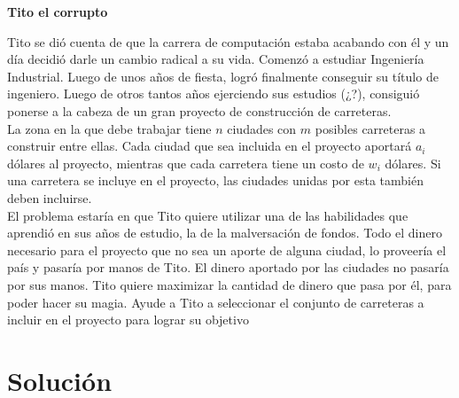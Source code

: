\documentclass[runningheads,a4paper]{llncs}
\begin{document}
	{
\begin{center}
{\large\bf Tito el corrupto}\\
\end{center}
Tito se di\'o cuenta de que la carrera de computaci\'on estaba acabando con \'el y
un d\'ia decidi\'o darle un cambio radical a su vida. Comenz\'o a estudiar Ingenier\'ia
Industrial. Luego de unos a\~nos de fiesta, logr\'o finalmente conseguir su t\'itulo
de ingeniero. Luego de otros tantos a\~nos ejerciendo sus estudios (¿?), consigui\'o
ponerse a la cabeza de un gran proyecto de construcci\'on de carreteras.\\

La zona en la que debe trabajar tiene $n$ ciudades con $m$ posibles carreteras
a construir entre ellas. Cada ciudad que sea incluida en el proyecto aportar\'a $a_i$
d\'olares al proyecto, mientras que cada carretera tiene un costo de $w_i$ d\'olares.
Si una carretera se incluye en el proyecto, las ciudades unidas por esta tambi\'en
deben incluirse.\\

El problema estar\'ia en que Tito quiere utilizar una de las habilidades que
aprendi\'o en sus a\~nos de estudio, la de la malversaci\'on de fondos. Todo el dinero
necesario para el proyecto que no sea un aporte de alguna ciudad, lo proveer\'ia
el pa\'is y pasar\'ia por manos de Tito. El dinero aportado por las ciudades no
pasar\'ia por sus manos. Tito quiere maximizar la cantidad de dinero que pasa
por \'el, para poder hacer su magia. Ayude a Tito a seleccionar el conjunto de
carreteras a incluir en el proyecto para lograr su objetivo

\newpage
\begin{abstract}
 Se tienen $n$ ciudades y $m$ posibles carreteras a construir, cada ciudad que sea incluida en el proyecto aportar\'a $a_i$ d\'olares y la construcci\'on de la carretera cuesta $w_i$ d\'olares. Todo el dinero necesario para el proyecto que no sea un aporte de alguna ciudad, lo proveer\'ia el pa\'is y entonces pasar\'ia a manos de Tito. Se quiere seleccionar un conjunto de carreteras a incluir en el proyecto que maximice la cantidad de dinero que pasa
por Tito. 

\end{abstract}

\section{Soluci\'on}

}
\end{document}
